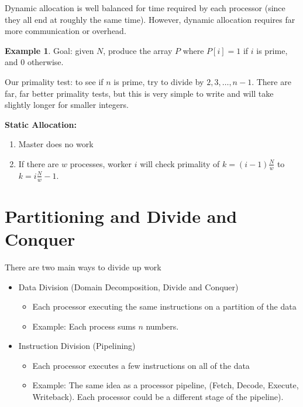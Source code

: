 \documentclass[12pt]{article}
\numberwithin{equation}{section}
\theoremstyle{theorem}
\theoremstyle{definition}
\newtheorem{example}{Example}[section]
\theoremstyle{remark}
\begin{document}
Dynamic allocation is well balanced for time required by each processor (since they all end at roughly the same time).  However, dynamic allocation requires far more communication or overhead.  

\begin{example} Goal: given $N$, produce the array $P$ where $P[i] = 1$ if $i$ is prime, and 0 otherwise. 

Our primality test:  to see if $n$ is prime, try to divide by $2, 3, \dots, n - 1$.  There are far, far better primality tests, but this is very simple to write and will take slightly longer for smaller integers. 

\textbf{Static Allocation:}
\begin{enumerate}
\item Master does no work
\item If there are $w$ processes, worker $i$ will check primality of $k = (i - 1)\frac{N}{w}$ to $k = i\frac{N}{w} - 1$.  
\end{enumerate}
\end{example}

\section{Partitioning and Divide and Conquer}
There are two main ways to divide up work
\begin{itemize}
\item Data Division (Domain Decomposition, Divide and Conquer)
	\begin{itemize}
	\item Each processor executing the same instructions on a partition of the data
	\item Example: Each process sums $n$ numbers.
	\end{itemize}
\item Instruction Division (Pipelining)
	\begin{itemize}
	\item Each processor executes a few instructions on all of the data
	\item Example: The same idea as a processor pipeline, (Fetch, Decode, Execute, Writeback).  Each processor could be a different stage of the pipeline).
	\end{itemize}
\end{itemize}
\end{document}
